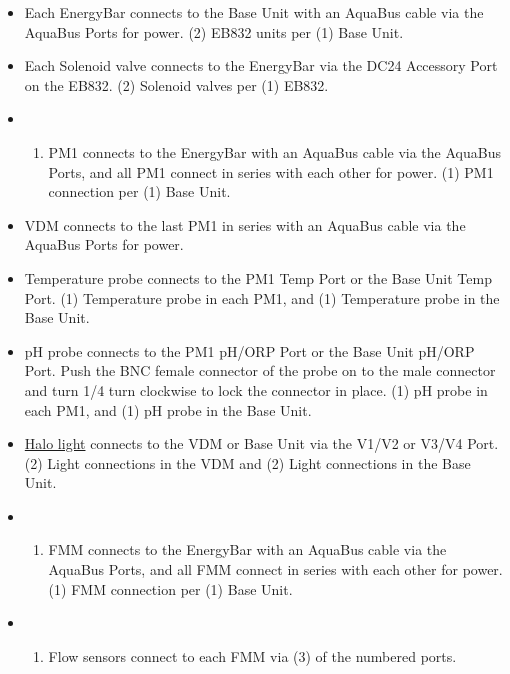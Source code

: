 \documentclass[]{book}
\providecommand{\tightlist}{%
  \setlength{\itemsep}{0pt}\setlength{\parskip}{0pt}}
\begin{document}
\begin{itemize}
\item
  Each EnergyBar connects to the Base Unit with an AquaBus cable via the
  AquaBus Ports for power. (2) EB832 units per (1) Base Unit.\\
\item
  Each Solenoid valve connects to the EnergyBar via the DC24 Accessory
  Port on the EB832. (2) Solenoid valves per (1) EB832.\\
\item
  \begin{enumerate}
  \def\labelenumi{(\arabic{enumi})}
  \tightlist
  \item
    PM1 connects to the EnergyBar with an AquaBus cable via the AquaBus
    Ports, and all PM1 connect in series with each other for power. (1)
    PM1 connection per (1) Base Unit.\\
  \end{enumerate}
\item
  VDM connects to the last PM1 in series with an AquaBus cable via the
  AquaBus Ports for power.\\
\item
  Temperature probe connects to the PM1 Temp Port or the Base Unit Temp
  Port. (1) Temperature probe in each PM1, and (1) Temperature probe in
  the Base Unit.\\
\item
  pH probe connects to the PM1 pH/ORP Port or the Base Unit pH/ORP Port.
  Push the BNC female connector of the probe on to the male connector
  and turn 1/4 turn clockwise to lock the connector in place. (1) pH
  probe in each PM1, and (1) pH probe in the Base Unit.\\
\item
  \href{/Manuals/HALO_Quick_Start_Guide.pdf}{Halo light} connects to the
  VDM or Base Unit via the V1/V2 or V3/V4 Port. (2) Light connections in
  the VDM and (2) Light connections in the Base Unit.\\
\item
  \begin{enumerate}
  \def\labelenumi{(\arabic{enumi})}
  \tightlist
  \item
    FMM connects to the EnergyBar with an AquaBus cable via the AquaBus
    Ports, and all FMM connect in series with each other for power. (1)
    FMM connection per (1) Base Unit.\\
  \end{enumerate}
\item
  \begin{enumerate}
  \def\labelenumi{(\arabic{enumi})}
  \setcounter{enumi}{2}
  \tightlist
  \item
    Flow sensors connect to each FMM via (3) of the numbered ports.
  \end{enumerate}
\end{itemize}
\end{document}
